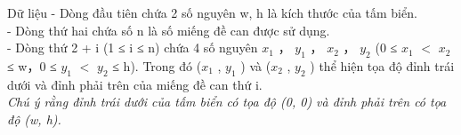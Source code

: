 Dữ liệu  
- Dòng đầu tiên chứa 2 số nguyên w, h là kích thước của tấm biển.   
\\   - Dòng thứ hai chứa số n là số miếng đề can được sử dụng.   
\\   - Dòng thứ 2 + i (1 ≤ i ≤ n) chứa 4 số nguyên $x_{1}$   ， $y_{1}$   ， $x_{2}$   ， $y_{2}$   (0 ≤ $x_{1}$   $<$ $x_{2}$   ≤ w，0 ≤ $y_{1}$   $<$ $y_{2}$   ≤ h). Trong đó ($x_{1}$   , $y_{1}$   ) và ($x_{2}$   , $y_{2}$   ) thể hiện tọa độ đỉnh trái dưới và đỉnh phải trên của miếng đề can thứ i.   
\\\textit{     Chú ý rằng đỉnh trái dưới của tấm biển có tọa độ (0, 0) và đỉnh phải trên có tọa độ (w, h).    }